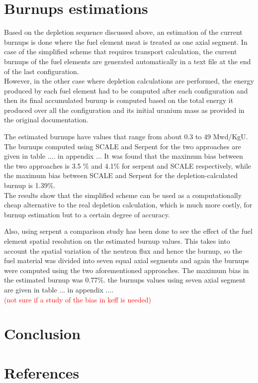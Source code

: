 \documentclass[review]{elsarticle}
\begin{document}
\section{Burnups estimations}
 Based on the depletion sequence discussed above, an estimation of the current burnups is done where the fuel element meat is treated as one axial segment.
 In case of the simplified scheme that requires transport calculation, the current burnups of the fuel elements are generated automatically in a text file at the end of the last configuration.\\
  However, in the other case where depletion calculations are performed, the energy produced by each fuel element had to be computed after each configuration and then its final accumulated burnup is computed based on the total energy it produced over all the configuration and its initial uranium mass as provided in the original documentation.
  
  The estimated burnups have values that range from about 0.3 to 49 Mwd/KgU. The burnups computed using SCALE and Serpent for the two approaches are given in table .... in appendix ...
  It was found that the maximum bias between the two approaches is 3.5 \% and 4.1\% for serpent and SCALE respectively, while the maximum bias between SCALE and Serpent for the depletion-calculated burnup is 1.39\%.\\
  The results show that the simplified scheme can be used as a computationally cheap alternative to the real depletion calculation, which is much more costly, for burnup estimation but to a certain degree of accuracy.
  
  Also, using serpent a comparison study has been done to see the effect of the fuel element spatial resolution on the estimated burnup values. This takes into account the spatial variation of the neutron flux and hence the burnup, so the fuel material was divided into seven equal axial segments and again the burnups were computed using the two aforementioned approaches. 
  The maximum bias in the estimated burnup was 0.77\%. the burnups values using seven axial segment are given in table ... in appendix ....\\ 
  \textcolor{red}{(not sure if a study of the bias in keff is needed)}
  
 
\section{Conclusion}

\section*{References}


\end{document}
